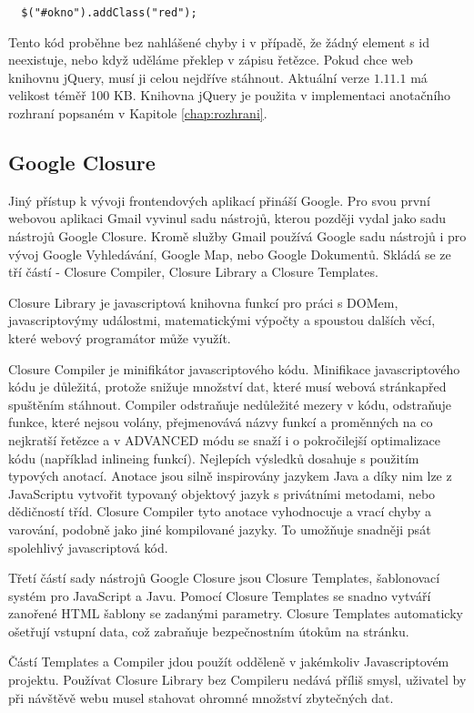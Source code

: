 \begin{lstlisting}
  $("#okno").addClass("red");
\end{lstlisting}

Tento kód proběhne bez nahlášené chyby i v případě, že žádný element s id  neexistuje, nebo když uděláme překlep v zápisu řetězce. Pokud chce web knihovnu jQuery, musí ji celou nejdříve stáhnout. Aktuální verze $1.11.1$ má velikost téměř 100 KB. Knihovna jQuery je použita v implementaci anotačního rozhraní popsaném v Kapitole \ref{chap:rozhrani}.

\subsection{Google Closure}
Jiný přístup k vývoji frontendových aplikací přináší Google. Pro svou první webovou aplikaci Gmail vyvinul sadu nástrojů, kterou později vydal jako sadu nástrojů Google Closure. Kromě služby Gmail používá Google sadu nástrojů i pro vývoj Google Vyhledávání, Google Map, nebo Google Dokumentů. Skládá se ze tří částí - Closure Compiler, Closure Library a Closure Templates.

Closure Library je javascriptová knihovna funkcí pro práci s DOMem, javascriptovýmy událostmi, matematickými výpočty a spoustou dalších věcí, které webový programátor může využít.

Closure Compiler je minifikátor javascriptového kódu. Minifikace javascriptového kódu je důležitá, protože snižuje množství dat, které musí webová stránkapřed spuštěním stáhnout. Compiler odstraňuje nedůležité mezery v kódu, odstraňuje funkce, které nejsou volány, přejmenovává názvy funkcí a proměnných na co nejkratší řetězce a v ADVANCED módu se snaží i o pokročilejší optimalizace kódu (například inlineing funkcí). Nejlepích výsledků dosahuje s použitím typových anotací. Anotace jsou silně inspirovány jazykem Java a díky nim lze z JavaScriptu vytvořit typovaný objektový jazyk s privátními metodami, nebo dědičností tříd. Closure Compiler tyto anotace vyhodnocuje a vrací chyby a varování, podobně jako jiné kompilované jazyky. To umožňuje snadněji psát spolehlivý javascriptová kód.

Třetí částí sady nástrojů Google Closure jsou Closure Templates, šablonovací systém pro JavaScript a Javu. Pomocí Closure Templates se snadno vytváří zanořené HTML šablony se zadanými parametry. Closure Templates automaticky ošetřují vstupní data, což zabraňuje bezpečnostním útokům na stránku.

Částí Templates a Compiler jdou použít odděleně v jakémkoliv Javascriptovém projektu. Používat Closure Library bez Compileru nedává příliš smysl, uživatel by při návštěvě webu musel stahovat ohromné množství zbytečných dat.

